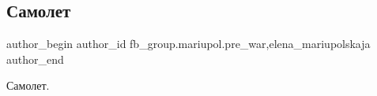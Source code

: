  
 
 
 
 

\subsection{Самолет}
\label{sec:03_02_2023.fb.fb_group.mariupol.pre_war.2.samolet}
 
\ifcmt
 author_begin
   author_id fb_group.mariupol.pre_war,elena_mariupolskaja
 author_end
\fi

Самолет.

